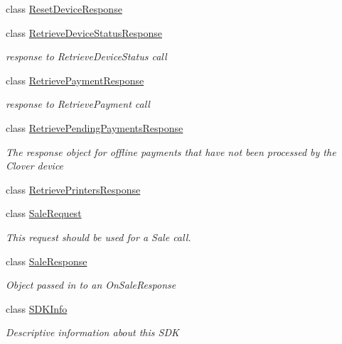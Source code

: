 \begin{DoxyCompactItemize}
class \hyperlink{classcom_1_1clover_1_1remotepay_1_1sdk_1_1_reset_device_response}{Reset\+Device\+Response}
\item 
class \hyperlink{classcom_1_1clover_1_1remotepay_1_1sdk_1_1_retrieve_device_status_response}{Retrieve\+Device\+Status\+Response}
\begin{DoxyCompactList}\small\item\em response to Retrieve\+Device\+Status call \end{DoxyCompactList}\item 
class \hyperlink{classcom_1_1clover_1_1remotepay_1_1sdk_1_1_retrieve_payment_response}{Retrieve\+Payment\+Response}
\begin{DoxyCompactList}\small\item\em response to Retrieve\+Payment call \end{DoxyCompactList}\item 
class \hyperlink{classcom_1_1clover_1_1remotepay_1_1sdk_1_1_retrieve_pending_payments_response}{Retrieve\+Pending\+Payments\+Response}
\begin{DoxyCompactList}\small\item\em The response object for offline payments that have not been processed by the Clover device \end{DoxyCompactList}\item 
class \hyperlink{classcom_1_1clover_1_1remotepay_1_1sdk_1_1_retrieve_printers_response}{Retrieve\+Printers\+Response}
\item 
class \hyperlink{classcom_1_1clover_1_1remotepay_1_1sdk_1_1_sale_request}{Sale\+Request}
\begin{DoxyCompactList}\small\item\em This request should be used for a Sale call. \end{DoxyCompactList}\item 
class \hyperlink{classcom_1_1clover_1_1remotepay_1_1sdk_1_1_sale_response}{Sale\+Response}
\begin{DoxyCompactList}\small\item\em Object passed in to an On\+Sale\+Response \end{DoxyCompactList}\item 
class \hyperlink{classcom_1_1clover_1_1remotepay_1_1sdk_1_1_s_d_k_info}{S\+D\+K\+Info}
\begin{DoxyCompactList}\small\item\em Descriptive information about this S\+DK \end{DoxyCompactList}\item 

\end{DoxyCompactItemize}
